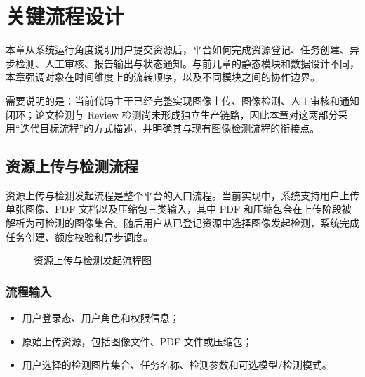 \section{关键流程设计}

本章从系统运行角度说明用户提交资源后，平台如何完成资源登记、任务创建、异步检测、人工审核、报告输出与状态通知。与前几章的静态模块和数据设计不同，本章强调对象在时间维度上的流转顺序，以及不同模块之间的协作边界。

需要说明的是：当前代码主干已经完整实现图像上传、图像检测、人工审核和通知闭环；论文检测与 Review 检测尚未形成独立生产链路，因此本章对这两部分采用“迭代目标流程”的方式描述，并明确其与现有图像检测流程的衔接点。

\subsection{资源上传与检测流程}
资源上传与检测发起流程是整个平台的入口流程。当前实现中，系统支持用户上传单张图像、PDF 文档以及压缩包三类输入，其中 PDF 和压缩包会在上传阶段被解析为可检测的图像集合。随后用户从已登记资源中选择图像发起检测，系统完成任务创建、额度校验和异步调度。

\begin{figure}[H]
    \centering
    \resizebox{0.98\textwidth}{!}{}
    \caption{资源上传与检测发起流程图}
\end{figure}

\subsubsection{流程输入}
\begin{itemize}[leftmargin=2em]
    \item 用户登录态、用户角色和权限信息；
    \item 原始上传资源，包括图像文件、PDF 文件或压缩包；
    \item 用户选择的检测图片集合、任务名称、检测参数和可选模型/检测模式。
\end{itemize}


